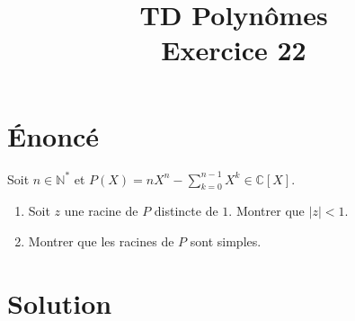 \documentclass[french]{article}
\title{TD Polynômes \\ Exercice 22}
\date{}
\newcommand{\N}{\mathbb{N}}
\newcommand{\C}{\mathbb{C}}
\newcommand{\st}{^*}
\begin{document}
\maketitle

\section{Énoncé}
Soit $n\in\N\st$ et $P(X)=nX^n-\sum_{k=0}^{n-1}X^k\in\C[X]$.
\begin{enumerate}
	\item Soit $z$ une racine de $P$ distincte de $1$. Montrer que $\lvert z\rvert <1$.
	\item Montrer que les racines de $P$ sont simples.
\end{enumerate}
\section{Solution}
\end{document}
